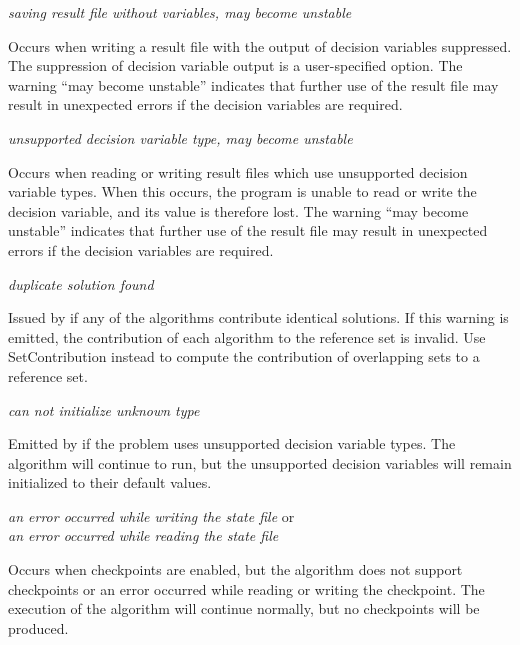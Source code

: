 \noindent
\textit{saving result file without variables, may become unstable}
\begin{indented}
  Occurs when writing a result file with the output of decision variables suppressed.  The suppression of decision variable output is a user-specified option.  The warning ``may become unstable'' indicates that further use of the result file may result in unexpected errors if the decision variables are required.
\end{indented}
  
\noindent
\textit{unsupported decision variable type, may become unstable}
\begin{indented}
  Occurs when reading or writing result files which use unsupported decision variable types.  When this occurs, the program is unable to read or write the decision variable, and its value is therefore lost.  The warning ``may become unstable'' indicates that further use of the result file may result in unexpected errors if the decision variables are required.
\end{indented}
  
\noindent
\textit{duplicate solution found}
\begin{indented}
  Issued by  if any of the algorithms contribute identical solutions.  If this warning is emitted, the contribution of each algorithm to the reference set is invalid.  Use SetContribution instead to compute the contribution of overlapping sets to a reference set.
\end{indented}
  
\noindent
\textit{can not initialize unknown type}
\begin{indented}
  Emitted by  if the problem uses unsupported decision variable types.  The algorithm will continue to run, but the unsupported decision variables will remain initialized to their default values.
\end{indented}

\noindent
\textit{an error occurred while writing the state file} or\\
\textit{an error occurred while reading the state file}
\begin{indented}
  Occurs when checkpoints are enabled, but the algorithm does not support checkpoints or an error occurred while reading or writing the checkpoint.  The execution of the algorithm will continue normally, but no checkpoints will be produced.
\end{indented}
  
